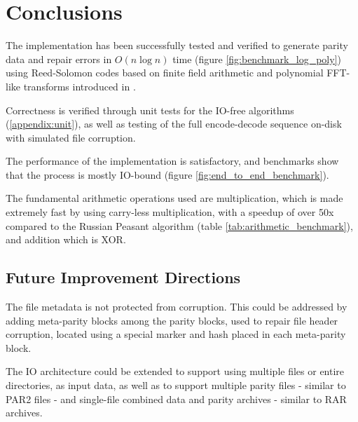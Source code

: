 \chapter{Conclusions}

The implementation has been successfully tested and verified to generate parity data and repair errors in $O(n \log n)$ time (figure \ref{fig:benchmark_log_poly})
using Reed-Solomon codes based on finite field arithmetic and polynomial FFT-like transforms introduced in \cite{novel-poly}.

Correctness is verified through unit tests for the IO-free algorithms (\ref{appendix:unit}), as well as testing of the full encode-decode sequence on-disk with simulated file corruption.

The performance of the implementation is satisfactory, and benchmarks show that the process is mostly IO-bound (figure \ref{fig:end_to_end_benchmark}).

The fundamental arithmetic operations used are  multiplication, which is made extremely fast by using carry-less multiplication,
with a speedup of over 50x compared to the Russian Peasant algorithm (table \ref{tab:arithmetic_benchmark}), and  addition which is XOR.

\vspace{-1.5em}
\section{Future Improvement Directions}
\vspace{-0.5em}

The file metadata is not protected from corruption. This could be addressed by adding meta-parity blocks among the parity blocks, used to repair file header corruption, located using a special marker and hash placed in each meta-parity block.

The IO architecture could be extended to support using multiple files or entire directories, as input data, as well as to support multiple parity files - similar to PAR2 files - and single-file combined data and parity archives - similar to RAR archives.



